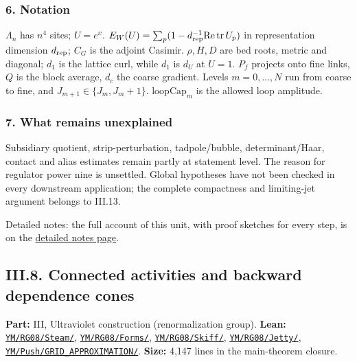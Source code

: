 \documentclass[
  letterpaper,
  11pt]{article}
\begin{document}
\subsubsection{6. Notation}\label{notation-9}

\(\Lambda_n\) has \(n^4\) sites; \(U=e^x\).
\(E_W(U)=\sum_p(1-d_{\rm rep}^{-1}\mathrm{Re}\,\mathrm{tr}\,U_p)\) in
representation dimension \(d_{\rm rep}\); \(C_G\) is the adjoint
Casimir. \(\rho,H,D\) are bed roots, metric and diagonal; \(d_1\) is the
lattice curl, while \(d_{\!1}\) is \(d_U\) at \(U=1\). \(P_f\) projects
onto fine links, \(Q\) is the block average, \(d_c\) the coarse
gradient. Levels \(m=0,\ldots,N\) run from coarse to fine, and
\(J_{m+1}\in\{J_m,J_m+1\}\). \(\mathrm{loopCap}_m\) is the allowed loop
amplitude.

\subsubsection{7. What remains
unexplained}\label{what-remains-unexplained-9}

Subsidiary quotient, strip-perturbation, tadpole/bubble,
determinant/Haar, contact and alias estimates remain partly at statement
level. The reason for regulator power nine is unsettled. Global
hypotheses have not been checked in every downstream application; the
complete compactness and limiting-jet argument belongs to III.13.

Detailed notes: the full account of this unit, with proof sketches for
every step, is on the
\href{https://github.com/scottnarmstrong/yang-mills-informalization/blob/main/outline/notes/III-7.md}{detailed
notes page}.

\subsection{III.8. Connected activities and backward dependence
cones}\label{iii.8.-connected-activities-and-backward-dependence-cones}

\textbf{Part:} III, Ultraviolet construction (renormalization group).
\textbf{Lean:}
\href{https://github.com/yang-mills-group/OpenAI-YM-20261028/tree/3456e5e75cf8d4cd558955a5c7638fba2d68f464/YM/RG08/Steam}{\texttt{YM/RG08/Steam/}},
\href{https://github.com/yang-mills-group/OpenAI-YM-20261028/tree/3456e5e75cf8d4cd558955a5c7638fba2d68f464/YM/RG08/Forms}{\texttt{YM/RG08/Forms/}},
\href{https://github.com/yang-mills-group/OpenAI-YM-20261028/tree/3456e5e75cf8d4cd558955a5c7638fba2d68f464/YM/RG08/Skiff}{\texttt{YM/RG08/Skiff/}},
\href{https://github.com/yang-mills-group/OpenAI-YM-20261028/tree/3456e5e75cf8d4cd558955a5c7638fba2d68f464/YM/RG08/Jetty}{\texttt{YM/RG08/Jetty/}},
\href{https://github.com/yang-mills-group/OpenAI-YM-20261028/tree/3456e5e75cf8d4cd558955a5c7638fba2d68f464/YM/Push/GRID_APPROXIMATION}{\texttt{YM/Push/GRID\_APPROXIMATION/}}.
\textbf{Size:} 4,147 lines in the main-theorem closure.
\end{document}
